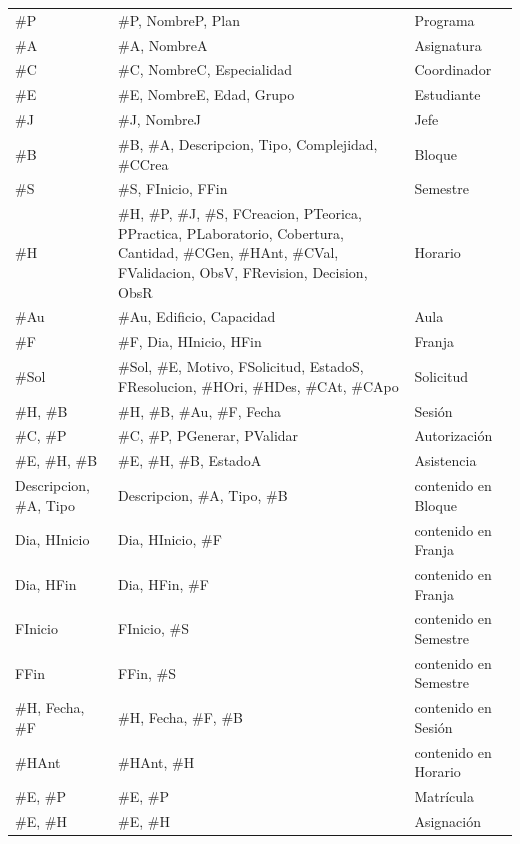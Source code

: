{\footnotesize\filas
\begin{xltabular}{\linewidth}{L{0.5}L{1.75}L{0.75}}
 &  &  \\
\endhead
\#P & \#P, NombreP, Plan & Programa \\
\#A & \#A, NombreA & Asignatura \\
\#C & \#C, NombreC, Especialidad & Coordinador \\
\#E & \#E, NombreE, Edad, Grupo & Estudiante \\
\#J & \#J, NombreJ & Jefe \\
\#B & \#B, \#A, Descripcion, Tipo, Complejidad, \#CCrea & Bloque \\
\#S & \#S, FInicio, FFin & Semestre \\
\#H & \#H, \#P, \#J, \#S, FCreacion, PTeorica, PPractica, PLaboratorio, Cobertura, Cantidad, \#CGen, \#HAnt, \#CVal, FValidacion, ObsV, FRevision, Decision, ObsR & Horario \\
\#Au & \#Au, Edificio, Capacidad & Aula \\
\#F & \#F, Dia, HInicio, HFin & Franja \\
\#Sol & \#Sol, \#E, Motivo, FSolicitud, EstadoS, FResolucion, \#HOri, \#HDes, \#CAt, \#CApo & Solicitud \\
\#H, \#B & \#H, \#B, \#Au, \#F, Fecha & Sesión \\
\#C, \#P & \#C, \#P, PGenerar, PValidar & Autorización \\
\#E, \#H, \#B & \#E, \#H, \#B, EstadoA & Asistencia \\
Descripcion, \#A, Tipo & Descripcion, \#A, Tipo, \#B & contenido en Bloque \\
Dia, HInicio & Dia, HInicio, \#F & contenido en Franja \\
Dia, HFin & Dia, HFin, \#F & contenido en Franja \\
FInicio & FInicio, \#S & contenido en Semestre \\
FFin & FFin, \#S & contenido en Semestre \\
\#H, Fecha, \#F & \#H, Fecha, \#F, \#B & contenido en Sesión \\
\#HAnt & \#HAnt, \#H & contenido en Horario \\
\#E, \#P & \#E, \#P & Matrícula \\
\#E, \#H & \#E, \#H & Asignación \\
\end{xltabular}}
